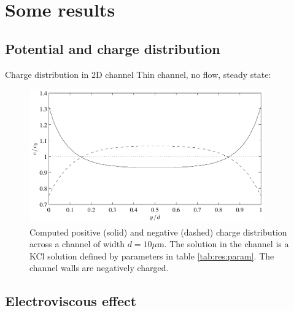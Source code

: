 \section{Some results}

\subsection{Potential and charge distribution}

\begin{frame}{Charge distribution in 2D channel}
Thin channel, no flow, steady state:

\begin{figure}
\begin{center}
\includegraphics[width=0.9\textwidth]{../fig/charge_1d.pdf}
\end{center}
\caption{Computed positive (solid) and negative (dashed) charge
  distribution across a channel of width $d = 10 \mu$m. The solution
  in the channel is a KCl solution defined by parameters in table
  \ref{tab:res:param}. The channel walls are negatively charged.}
\label{fig:res:c_1d}
\end{figure}

\end{frame}

\subsection{Electroviscous effect}

